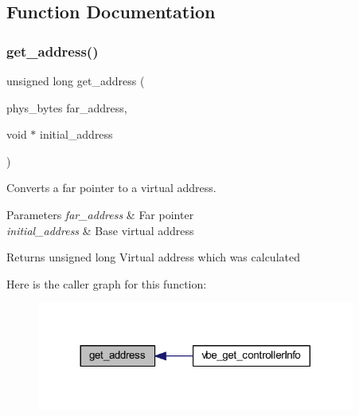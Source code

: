 \subsection{Function Documentation}
\mbox{\label{group__vbe_gade4fa75fe0fb04b2752fff230f59ae5b}} 
\subsubsection{\texorpdfstring{get\+\_\+address()}{get\_address()}}
{\footnotesize\ttfamily unsigned long get\+\_\+address (\begin{DoxyParamCaption}\item[{phys\+\_\+bytes}]{far\+\_\+address,  }\item[{void $\ast$}]{initial\+\_\+address }\end{DoxyParamCaption})}



Converts a far pointer to a virtual address. 


\begin{DoxyParams}{Parameters}
{\em far\+\_\+address} & Far pointer \\
\hline
{\em initial\+\_\+address} & Base virtual address \\
\hline
\end{DoxyParams}
\begin{DoxyReturn}{Returns}
unsigned long Virtual address which was calculated 
\end{DoxyReturn}
Here is the caller graph for this function\+:\nopagebreak
\begin{figure}[H]
\begin{center}
\leavevmode
\includegraphics[width=296pt]{group__vbe_gade4fa75fe0fb04b2752fff230f59ae5b_icgraph}
\end{center}
\end{figure}
\mbox{\label{group__vbe_gac4f0e0f63a38a9fece2405ffac61618b}} 
